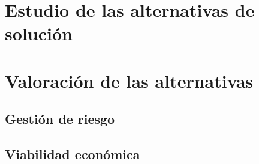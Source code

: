 \documentclass[10pt,a4paper,oldfontcommands]{dpds}
\begin{document}
\pagecolor{fondo}
\color{principal}










\section{Estudio de las alternativas de solución}





\section{Valoración de las alternativas}
\subsection{Gestión de riesgo}
\subsection{Viabilidad económica}


\end{document}
